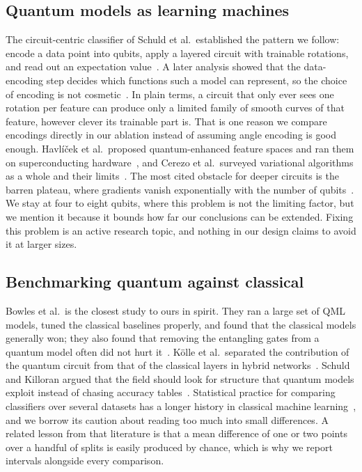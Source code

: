 \documentclass[12pt,onecolumn,draftclsnofoot]{IEEEtran}
\begin{document}
\subsection{Quantum models as learning machines}
The circuit-centric classifier of Schuld et al.\ established the pattern we follow: encode a data point into qubits, apply a layered circuit with trainable rotations, and read out an expectation value~\cite{schuld2020circuit}. A later analysis showed that the data-encoding step decides which functions such a model can represent, so the choice of encoding is not cosmetic~\cite{schuld2021encoding}. In plain terms, a circuit that only ever sees one rotation per feature can produce only a limited family of smooth curves of that feature, however clever its trainable part is. That is one reason we compare encodings directly in our ablation instead of assuming angle encoding is good enough. Havl\'i\v{c}ek et al.\ proposed quantum-enhanced feature spaces and ran them on superconducting hardware~\cite{havlicek2019supervised}, and Cerezo et al.\ surveyed variational algorithms as a whole and their limits~\cite{cerezo2021variational}. The most cited obstacle for deeper circuits is the barren plateau, where gradients vanish exponentially with the number of qubits~\cite{mcclean2018barren}. We stay at four to eight qubits, where this problem is not the limiting factor, but we mention it because it bounds how far our conclusions can be extended. Fixing this problem is an active research topic, and nothing in our design claims to avoid it at larger sizes.

\subsection{Benchmarking quantum against classical}
Bowles et al.\ is the closest study to ours in spirit. They ran a large set of QML models, tuned the classical baselines properly, and found that the classical models generally won; they also found that removing the entangling gates from a quantum model often did not hurt it~\cite{bowles2024better}. K\"olle et al.\ separated the contribution of the quantum circuit from that of the classical layers in hybrid networks~\cite{kolle2023disentangling}. Schuld and Killoran argued that the field should look for structure that quantum models exploit instead of chasing accuracy tables~\cite{schuld2022advantage}. Statistical practice for comparing classifiers over several datasets has a longer history in classical machine learning~\cite{demsar2006statistical}, and we borrow its caution about reading too much into small differences. A related lesson from that literature is that a mean difference of one or two points over a handful of splits is easily produced by chance, which is why we report intervals alongside every comparison.
\end{document}
